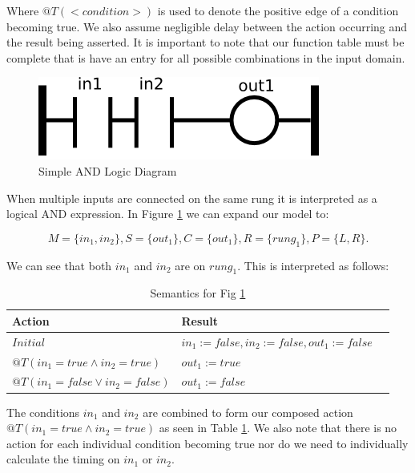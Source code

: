 Where $@T(<condition>)$ is used to denote the positive edge of a condition becoming true.
We also assume negligible delay between the action occurring and the result being asserted.
It is important to note that our function table must be complete that is have an entry for
all possible combinations in the input domain.

\begin{figure}[h]
    \centering
    \includegraphics[width=\imgsmall]{./images/intro_fig2.png}
    \caption{Simple AND Logic Diagram}
    \label{fig:intro_fig2}
\end{figure}

When multiple inputs are connected on the same rung it is interpreted as a logical AND 
expression. In Figure \ref{fig:intro_fig2} we can expand our model to:

$$M=\lbrace in_1, in_2 \rbrace, S=\lbrace out_1 \rbrace, C=\lbrace out_1 \rbrace, R=\lbrace rung_1 \rbrace, P=\lbrace L,R \rbrace.$$

We can see that both $in_1$ and $in_2$ are on $rung_1$. This is interpreted as follows:

\begin{table}[h]
    \centering
       \begin{tabular}{|l|l|l|}
        \hline
        Action & Result \\
        \hline
        $Initial$ & $in_1 := false, in_2 := false, out_1 := false$\\
        \hline
        $@T(in_1 = true \wedge in_2 = true)$ & $out_1 := true$ \\
        \hline
        $@T(in_1 = false \vee in_2 = false)$ & $out_1 := false$ \\
        \hline
    \end{tabular}
    \caption{Semantics for Fig \ref{fig:intro_fig2}}
    \label{table:table_for_fig2}
\end{table}

The conditions $in_1$ and $in_2$ are combined to form our composed action $@T(in_1 = true \wedge in_2 = true)$ 
as seen in Table \ref{table:table_for_fig2}. We also note that there is no action for each individual condition
becoming true nor do we need to individually calculate the timing on $in_1$ or $in_2$.


